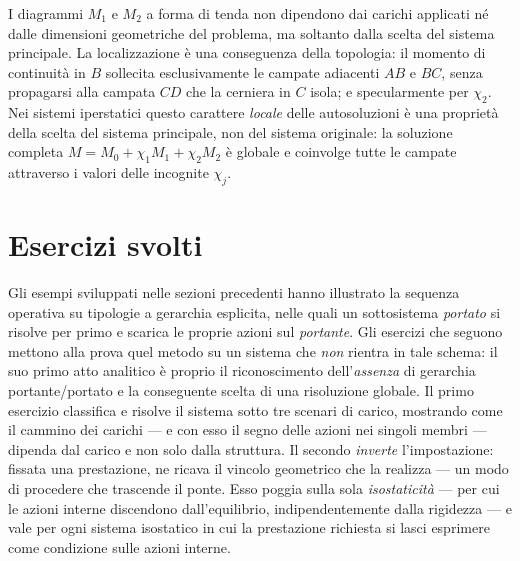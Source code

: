 \begin{oss}
I diagrammi $M_1$ e $M_2$ a forma di tenda non
dipendono dai carichi applicati né dalle dimensioni
geometriche del problema, ma soltanto dalla scelta
del sistema principale. La localizzazione è una
conseguenza della topologia: il momento di continuità
in $B$ sollecita esclusivamente le campate adiacenti
$AB$ e $BC$, senza propagarsi alla campata $CD$
che la cerniera in $C$ isola; e specularmente
per $\chi_2$.
Nei sistemi iperstatici questo carattere \emph{locale}
delle autosoluzioni è una proprietà della scelta
del sistema principale, non del sistema originale:
la soluzione completa $M = M_0 + \chi_1 M_1 + \chi_2 M_2$
è globale e coinvolge tutte le campate attraverso
i valori delle incognite $\chi_j$.
\end{oss}


\section{Esercizi svolti}
\label{sec:esercizi_eterogenei}

Gli esempi sviluppati nelle sezioni precedenti hanno illustrato la
sequenza operativa su tipologie a gerarchia esplicita, nelle quali un
sottosistema \emph{portato} si risolve per primo e scarica le proprie
azioni sul \emph{portante}. Gli esercizi che seguono mettono alla prova
quel metodo su un sistema che \emph{non} rientra in tale schema: il suo
primo atto analitico è proprio il riconoscimento dell'\emph{assenza} di
gerarchia portante/portato e la conseguente scelta di una risoluzione
globale. Il primo esercizio classifica e risolve il sistema sotto tre
scenari di carico, mostrando come il cammino dei carichi --- e con esso
il segno delle azioni nei singoli membri --- dipenda dal carico e non
solo dalla struttura. Il secondo \emph{inverte} l'impostazione: fissata una prestazione, ne ricava il vincolo geometrico che la realizza --- un modo di procedere che trascende il ponte. Esso poggia sulla sola \emph{isostaticità} --- per cui le azioni interne discendono dall'equilibrio, indipendentemente dalla rigidezza --- e vale per ogni sistema isostatico in cui la prestazione richiesta si lasci esprimere come condizione sulle azioni interne.


